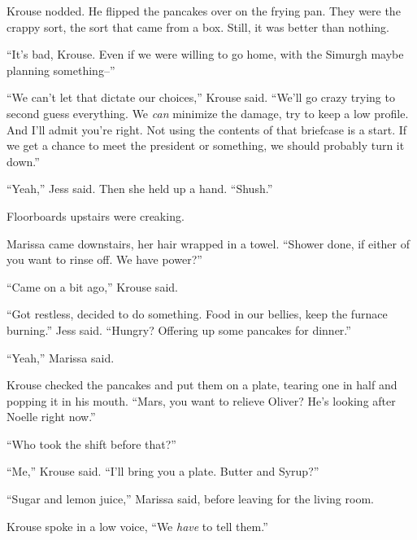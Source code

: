 Krouse nodded.  He flipped the pancakes over on the frying pan.  They were the crappy sort, the sort that came from a box.  Still, it was better than nothing.



``It's bad, Krouse.  Even if we were willing to go home, with the Simurgh maybe planning something--''



``We can't let that dictate our choices,'' Krouse said.  ``We'll go crazy trying to second guess everything.  We \emph{can} minimize the damage, try to keep a low profile.  And I'll admit you're right.  Not using the contents of that briefcase is a start.  If we get a chance to meet the president or something, we should probably turn it down.''



``Yeah,'' Jess said.  Then she held up a hand.  ``Shush.''



Floorboards upstairs were creaking.



Marissa came downstairs, her hair wrapped in a towel.  ``Shower done, if either of you want to rinse off.  We have power?''



``Came on a bit ago,'' Krouse said.



``Got restless, decided to do something.  Food in our bellies, keep the furnace burning.'' Jess said.  ``Hungry?  Offering up some pancakes for dinner.''



``Yeah,'' Marissa said.



Krouse checked the pancakes and put them on a plate, tearing one in half and popping it in his mouth.  ``Mars, you want to relieve Oliver?  He's looking after Noelle right now.''



``Who took the shift before that?''



``Me,'' Krouse said.  ``I'll bring you a plate.  Butter and Syrup?''



``Sugar and lemon juice,'' Marissa said, before leaving for the living room.



Krouse spoke in a low voice, ``We \emph{have} to tell them.''




